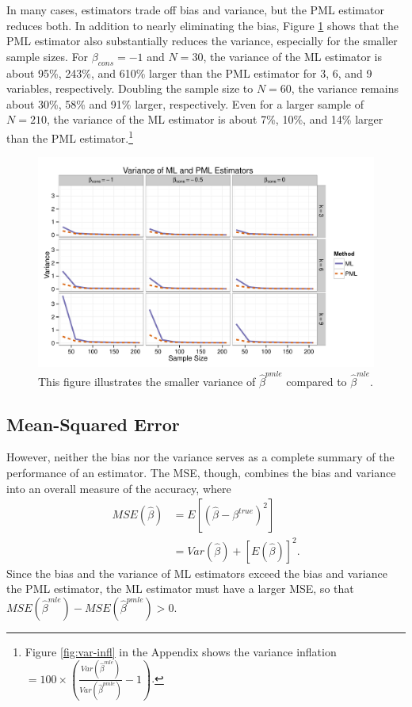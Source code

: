 \documentclass[12pt]{article}
\begin{document}
In many cases, estimators trade off bias and variance, but the PML estimator reduces both.
In addition to nearly eliminating the bias, Figure \ref{fig:sims-var} shows that the PML estimator also substantially reduces the variance, especially for the smaller sample sizes.
For $\beta_{cons} = -1$ and $N = 30$, the variance of the ML estimator is about 95\%, 243\%, and 610\% larger than the PML estimator for 3, 6, and 9 variables, respectively.
Doubling the sample size to $N = 60$, the variance remains about 30\%, 58\% and 91\% larger, respectively. 
Even for a larger sample of $N = 210$, the variance of the ML estimator is about 7\%, 10\%, and 14\% larger than the PML estimator.\footnote{Figure \ref{fig:var-infl} in the Appendix shows the variance inflation $= 100 \times \left(\frac{Var(\hat{\beta} ^{mle})}{Var(\hat{\beta}^{pmle})} - 1\right)$.}

\begin{figure}[h]
\begin{center}
\includegraphics[width = \textwidth]{figs/sims-var.pdf}
\caption{This figure illustrates the smaller variance of $\hat{\beta}^{pmle}$ compared to $\hat{\beta}^{mle}$.}\label{fig:sims-var}
\end{center}
\end{figure}

\subsection*{Mean-Squared Error}

However, neither the bias nor the variance serves as a complete summary of the performance of an estimator.
The MSE, though, combines the bias and variance into an overall measure of the accuracy, where
\begin{align}\label{eqn:mse}
MSE(\hat{\beta}) &= E[(\hat{\beta} - \beta^{true})^2] \nonumber\\
                            &= Var(\hat{\beta}) + [E(\hat{\beta})]^2 \text{.}
\end{align}
Since the bias and the variance of ML estimators exceed the bias and variance the PML estimator, the ML estimator must have a larger MSE, so that $MSE(\hat{\beta}^{mle}) - MSE(\hat{\beta}^{pmle}) > 0$.
\end{document}
